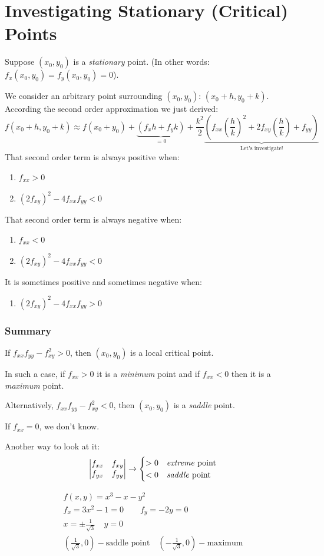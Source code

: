\documentclass[00_complete]{subfiles}
\begin{document}
\section{Investigating Stationary (Critical) Points}
Suppose $(x_0,y_0)$ is a \emph{stationary} point. (In other words:
$f_x(x_0,y_0)=f_y(x_0,y_0)=0$).

We consider an arbitrary point surrounding $(x_0,y_0)$: $(x_0+h,y_0+k)$.
According the second order approximation we just derived:
$$f(x_0+h,y_0+k)\approx f(x_0+y_0)+
\underbrace{(f_xh+f_yk)}_{=0}
+\frac{k^2}{2}\underbrace{\left(f_{xx}\left(\frac{h}{k}\right)^2
    +2f_{xy}\left(\frac{h}{k}\right)
    +f_{yy}\right)}_{\text{Let's investigate!}}
$$
That second order term is always positive when:
\begin{enumerate} \tightlist
    \item $f_{xx} > 0$
    \item $(2f_{xy})^2-4f_{xx}f_{yy}<0$
\end{enumerate}
That second order term is always negative when:
\begin{enumerate} \tightlist
    \item $f_{xx} < 0$
    \item $(2f_{xy})^2-4f_{xx}f_{yy}<0$
\end{enumerate}
It is sometimes positive and sometimes negative when:
\begin{enumerate} \tightlist
    \item $(2f_{xy})^2-4f_{xx}f_{yy}>0$
\end{enumerate}
\subsubsection{Summary}
If $f_{xx}f_{yy}-f_{xy}^2>0$, then $(x_0,y_0)$ is a local critical point.

In such a case, if $f_{xx}>0$ it is a \emph{minimum} point and if $f_{xx}<0$
then it is a \emph{maximum} point.

Alternatively, $f_{xx}f_{yy}-f_{xy}^2<0$, then $(x_0,y_0)$ is a \emph{saddle}
point.
\begin{note}
    If $f_{xx}=0$, we don't know.
\end{note}
Another way to look at it:
$$\begin{vmatrix}
    f_{xx}&f_{xy}\\f_{yx}&f_{yy}
\end{vmatrix}\to \begin{cases}
    >0 & \text{\emph{extreme} point} \\
    <0 & \text{\emph{saddle} point}
\end{cases}$$
\begin{example}
\begin{gather*}
    f(x,y)=x^3-x-y^2\\
    f_x=3x^2-1=0 \qquad f_y=-2y=0 \\
    x=\pm\frac{1}{\sqrt 3} \quad y=0 \\
    \left(\frac{1}{\sqrt 3},0\right) - \text{saddle point} \quad
    \left(-\frac{1}{\sqrt 3},0\right) - \text{maximum}
\end{gather*}
\end{example}
\end{document}
